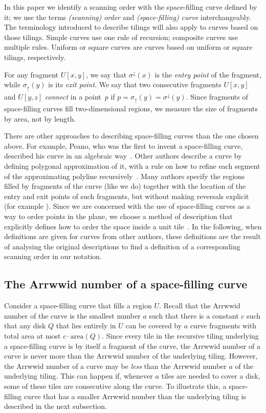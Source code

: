 \documentclass[11pt,a4paper]{article}
\newcommand{\area}{\mathrm{area}}
\newcommand{\unittile}{\ensuremath{U}\xspace}
\begin{document}
In this paper we identify a scanning order with the space-filling curve defined by it; we use the terms \emph{(scanning) order} and \emph{(space-filling) curve} interchangeably. The terminology introduced to describe tilings will also apply to curves based on those tilings. Simple curves use one rule of recursion; composite curves use multiple rules. Uniform or square curves are curves based on uniform or square tilings, respectively.

For any fragment $\unittile[x,y]$, we say that $\sigma^{\downarrow}(x)$ is the \emph{entry point} of the fragment, while $\sigma_{\uparrow}(y)$ is its \emph{exit point}. We say that two consecutive fragments $\unittile[x,y]$ and $\unittile[y,z]$ \emph{connect} in a point~$p$ if $p = \sigma_{\uparrow}(y) = \sigma^{\downarrow}(y)$. Since fragments of space-filling curves fill two-dimensional regions, we measure the size of fragments by area, not by length.

There are other approaches to describing space-filling curves than the one chosen above. For example, Peano, who was the first to invent a space-filling curve, described his curve in an algebraic way~\cite{Peano1890}. Other authors describe a curve by defining polygonal approximation of it, with a rule on how to refine each segment of the approximating polyline recursively~\cite{Gardner1976}. Many authors specify the regions filled by fragments of the curve (like we do) together with the location of the entry and exit points of such fragments, but without making reversals explicit (for example \cite{Asano1997,Sagan1994,Wierum2002}). Since we are concerned with the use of space-filling curves as a way to order points in the plane, we choose a method of description that explicitly defines how to order the space inside a unit tile~\cite{Haverkort2009}.
In the following, when definitions are given for curves from other authors, these definitions are the result of analysing the original descriptions to find a definition of a corresponding scanning order in our notation.

\subsection{The Arrwwid number of a space-filling curve}
Consider a space-filling curve that fills a region \unittile. Recall that the Arrwwid number of the curve is the smallest number $a$ such that there is a constant $c$ such that any disk $Q$ that lies entirely in \unittile can be covered by $a$ curve fragments with total area at most $c \cdot \area(Q)$. Since every tile in the recursive tiling underlying a space-filling curve is by itself a fragment of the curve, the Arrwwid number of a curve is never more than the Arrwwid number of the underlying tiling. However, the Arrwwid number of a curve may be \emph{less} than the Arrwwid number $a$ of the underlying tiling. This can happen if, whenever $a$ tiles are needed to cover a disk, some of these tiles are consecutive along the curve. To illustrate this, a space-filling curve that has a smaller Arrwwid number than the underlying tiling is described in the next subsection.
\end{document}
